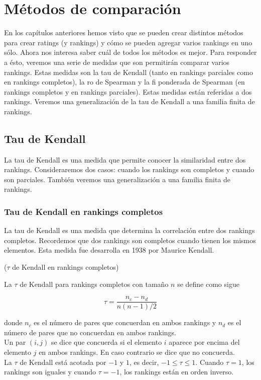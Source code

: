 \chapter{Métodos de comparación}

En los capítulos anteriores hemos visto que se pueden crear distintos métodos para crear ratings (y rankings) y cómo se pueden agregar varios rankings en uno sólo. Ahora nos interesa saber cuál de todos los métodos es mejor. Para responder a ésto, veremos una serie de medidas que son permitirán comparar varios rankings. Estas medidas son la tau de Kendall (tanto en rankings parciales como en rankings completos), la ro de Spearman y la fi ponderada de Spearman (en rankings completos y en rankings parciales). Estas medidas están referidas a dos rankings. Veremos una generalización de la tau de Kendall a una familia finita de rankings.  

\section{Tau de Kendall}

La tau de Kendall es una medida que permite conocer la similaridad entre dos rankings. Consideraremos dos casos: cuando los rankings son completos y cuando son parciales. También veremos una generalización a una familia finita de rankings.

\subsection{Tau de Kendall en rankings completos}

La tau de Kendall es una medida que determina la correlación entre dos rankings completos. Recordemos que dos rankings son completos cuando tienen los mismos elementos. Esta medida fue desarrolla en 1938 por Maurice Kendall.\\

\begin{defi}($\tau$ de Kendall en rankings completos) 

La $\tau$ de Kendall para rankings completos con tamaño $n$ se define como sigue

\begin{equation}
\tau = \dfrac{n_c - n_d}{n(n-1)/2}
\end{equation}

donde $n_c$ es el número de pares que concuerdan en ambos rankings y $n_d$ es el número de pares que no concuerdan en ambos rankings.\\

Un par $(i,j)$ se dice que concuerda si el elemento $i$ aparece por encima del elemento $j$ en ambos rankings. En caso contrario se dice que no concuerda.\\


La $\tau$ de Kendall está acotada por $-1$ y $1$, es decir, $-1 \leq \tau \leq 1$. Cuando $\tau = 1$, los rankings son iguales y cuando $\tau = -1$, los rankings están en orden inverso.  
\end{defi}

